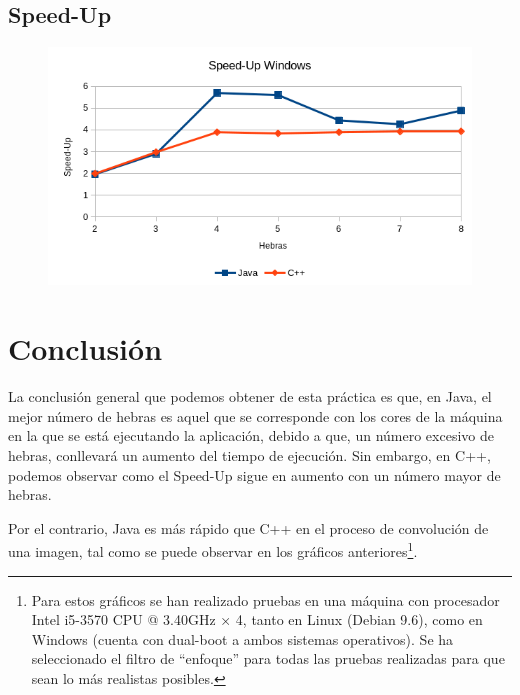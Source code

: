 \documentclass[12pt,letterpaper]{article}
\begin{document}
\subsection{Speed-Up}
\begin{figure}[h]
	\centering
	\includegraphics[scale=0.8]{SpeedUpWindows.png}
\end{figure}

\section{Conclusión}
La conclusión general que podemos obtener de esta práctica es que, en Java, el mejor número de hebras es aquel que se corresponde con los cores de la máquina en la que se está ejecutando la aplicación, debido a que, un número excesivo de hebras, conllevará un aumento del tiempo de ejecución. Sin embargo, en C++, podemos observar como el Speed-Up sigue en aumento con un número mayor de hebras.

Por el contrario, Java es más rápido que C++ en el proceso de convolución de una imagen, tal como se puede observar en los gráficos anteriores\footnote{Para estos gráficos se han realizado pruebas en una máquina con procesador Intel i5-3570 CPU @ 3.40GHz × 4, tanto en Linux (Debian 9.6), como en Windows (cuenta con dual-boot a ambos sistemas operativos). Se ha seleccionado el filtro de ``enfoque'' para todas las pruebas realizadas para que sean lo más realistas posibles.}.
\end{document}

